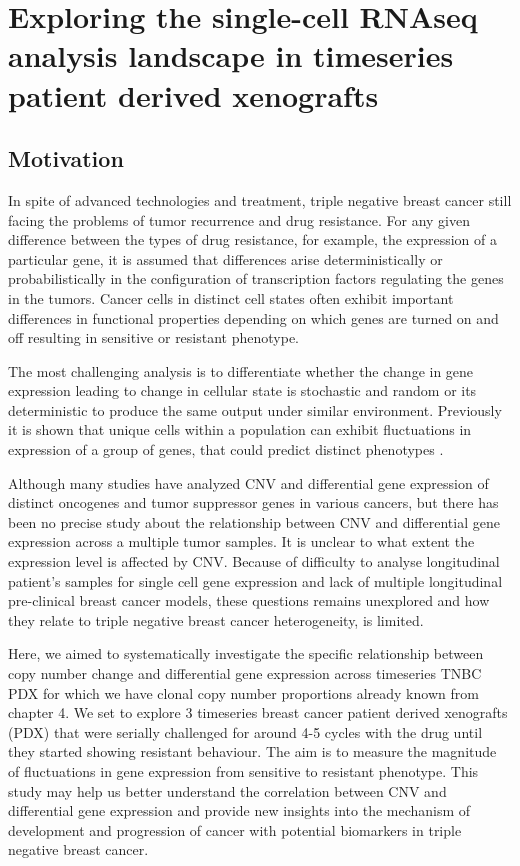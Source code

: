
{\chapter{Exploring the single-cell RNAseq analysis landscape in timeseries patient derived xenografts}

}
 \label{ch:Chapter5}
 \section{Motivation}

In spite of advanced technologies and treatment, triple negative breast cancer still facing the problems of tumor recurrence and drug resistance.
For any given difference between the types of drug resistance, for example, the expression of a particular gene, it is assumed that differences arise deterministically or probabilistically in the configuration of transcription factors regulating the genes in the tumors. Cancer cells in distinct cell states often exhibit important differences in functional properties depending on which genes are turned on and off resulting in sensitive or resistant phenotype.

The most challenging analysis is to differentiate whether the change in gene expression leading to change in cellular state is stochastic \cite{raj2008nature} and random or its deterministic to produce the same output under similar environment.
Previously it is shown that unique cells within a population can exhibit fluctuations in expression of a group of genes, that could predict distinct phenotypes \cite{shaffer2019memory}.

Although many studies have analyzed CNV and differential gene expression of distinct oncogenes and tumor suppressor genes in various cancers, \cite{kuzyk2015mycn, budczies2016pan, kwak2015fibroblast} but there has been no precise study about the relationship between CNV and differential gene expression across a multiple tumor samples. It is unclear to what extent the expression level is affected by CNV. Because of difficulty to analyse longitudinal patient's samples for single cell gene expression and lack of multiple longitudinal pre-clinical breast cancer models, these questions remains unexplored and how they relate to triple negative breast cancer heterogeneity, is limited.

Here, we aimed to systematically investigate the specific relationship between copy number change and differential gene expression across timeseries TNBC PDX for which we have clonal copy number proportions already known from chapter 4. We set to explore 3 timeseries breast cancer patient derived xenografts (PDX) that were serially challenged for around 4-5 cycles with the drug until they started showing resistant behaviour. The aim is to measure the magnitude of fluctuations in gene expression from sensitive to resistant phenotype.
This study may help us better understand the correlation between CNV and differential gene expression and provide new insights into the mechanism of development and progression of cancer with potential biomarkers in triple negative breast cancer.


